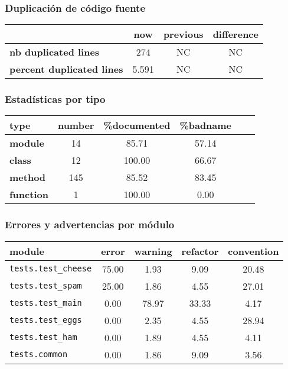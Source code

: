 \documentclass{beamer}
\begin{document}
\begin{frame}
\frametitle{Duplicación de código fuente}

\begin{tabular}{|l|c|c|c|}
\hline
                 & \textbf{now}   &\textbf{previous} &\textbf{difference} \\
\hline
\hline
\textbf{nb duplicated lines}      &274   &NC       &NC         \\
\hline
\textbf{percent duplicated lines} &5.591 &NC       &NC         \\
\hline
\end{tabular}
\end{frame}


\begin{frame}
\frametitle{Estadísticas por tipo}

\small
\begin{tabular}{|l|c|c|c|c|c|}
\hline
\textbf{type}     &\textbf{number} &\textbf{\%documented} &\textbf{\%badname} \\
\hline
\hline
\textbf{module}   &14     &85.71       &57.14    \\
\hline
\textbf{class}    &12     &100.00      &66.67    \\
\hline
\textbf{method}   &145    &85.52       &83.45    \\
\hline
\textbf{function} &1      &100.00      &0.00     \\
\hline
\end{tabular}
\end{frame}


\begin{frame}
\frametitle{Errores y advertencias por módulo}

\small
\begin{tabular}{|l|c|c|c|c|}
\hline
\textbf{module}                    &\textbf{error} &\textbf{warning} &\textbf{refactor} &\textbf{convention} \\
\hline
\hline
\texttt{tests.test\_cheese}         &75.00 &1.93    &9.09     &20.48      \\
\hline
\texttt{tests.test\_spam}         &25.00 &1.86    &4.55     &27.01      \\
\hline
\texttt{tests.test\_main}             &0.00  &78.97   &33.33    &4.17       \\
\hline
\texttt{tests.test\_eggs}         &0.00  &2.35    &4.55     &28.94      \\
\hline
\texttt{tests.test\_ham}         &0.00  &1.89    &4.55     &4.11       \\
\hline
\texttt{tests.common}        &0.00  &1.86    &9.09     &3.56       \\
\hline
\end{tabular}
\end{frame}
\end{document}
